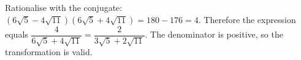Rationalise with the conjugate: $(6\sqrt5-4\sqrt{11})(6\sqrt5+4\sqrt{11})=180-176=4$. Therefore the expression equals $\boxed{\dfrac{4}{6\sqrt5+4\sqrt{11}}}=\boxed{\dfrac{2}{3\sqrt5+2\sqrt{11}}}$. The denominator is positive, so the transformation is valid.
